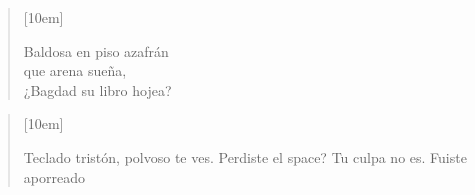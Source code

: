 \begin{verse}[10em]
	\begin{altverse}
		Baldosa en piso azafrán\\
		que arena sueña,\\
		¿Bagdad su libro hojea?\\
	\end{altverse}
\end{verse}

\begin{verse}[10em]
	\begin{altverse}
		Teclado tristón, polvoso te ves.
		Perdiste el space? Tu culpa no es.
		Fuiste aporreado
	\end{altverse}
\end{verse}
